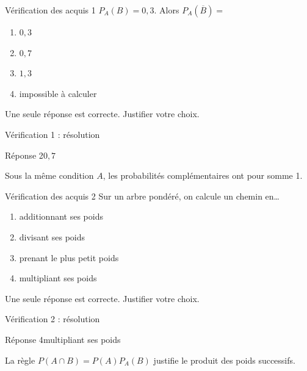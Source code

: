 \documentclass[aspectratio=169,12pt]{beamer}
\begin{document}
\renewcommand{\slidekind}{À VOUS DE JOUER}\begin{frame}[t]{Vérification des acquis 1}
$P_A(B)=0,3$. Alors $P_A(\overline B)=$\begin{enumerate}
\item $0,3$
\item $0,7$
\item $1,3$
\item impossible à calculer
\end{enumerate}\medskip Une seule réponse est correcte. Justifier votre choix.\end{frame}
\renewcommand{\slidekind}{COMPRENDRE LA RÉPONSE}\begin{frame}[t]{Vérification 1 : résolution}
\begin{block}{Réponse 2}$0,7$\end{block}\medskip Sous la même condition $A$, les probabilités complémentaires ont pour somme 1.\end{frame}
\renewcommand{\slidekind}{À VOUS DE JOUER}\begin{frame}[t]{Vérification des acquis 2}
Sur un arbre pondéré, on calcule un chemin en…\begin{enumerate}
\item additionnant ses poids
\item divisant ses poids
\item prenant le plus petit poids
\item multipliant ses poids
\end{enumerate}\medskip Une seule réponse est correcte. Justifier votre choix.\end{frame}
\renewcommand{\slidekind}{COMPRENDRE LA RÉPONSE}\begin{frame}[t]{Vérification 2 : résolution}
\begin{block}{Réponse 4}multipliant ses poids\end{block}\medskip La règle $P(A\cap B)=P(A)P_A(B)$ justifie le produit des poids successifs.\end{frame}
\end{document}

